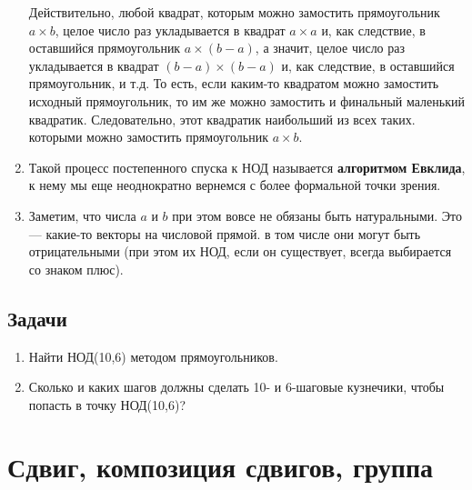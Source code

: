 \begin{enumerate}
Действительно, любой квадрат, которым можно замостить прямоугольник $a\times b$, целое число раз укладывается в квадрат $a\times a$ и, как следствие, в оставшийся прямоугольник $a\times(b-a)$, а значит, целое число раз укладывается в квадрат $(b-a)\times (b-a)$ и, как следствие, в оставшийся прямоугольник, и т.д. То есть, если каким-то квадратом можно замостить исходный прямоугольник, то им же можно замостить и финальный маленький квадратик. Следовательно, этот квадратик наибольший из всех таких. которыми можно замостить прямоугольник $a\times b$.
\item Такой процесс постепенного спуска к НОД называется \textbf{алгоритмом Евклида}, к нему мы еще неоднократно вернемся с более формальной точки зрения.
\item Заметим, что числа $a$ и $b$ при этом вовсе не обязаны быть натуральными. Это --- какие-то векторы на числовой прямой. в том числе они могут быть отрицательными (при этом их НОД, если он существует, всегда выбирается со знаком плюс).
\end{enumerate}
\subsection*{Задачи}
\begin{enumerate}
\item Найти НОД(10,6) методом прямоугольников.
\item Сколько и каких шагов должны сделать 10- и 6-шаговые кузнечики, чтобы попасть в точку НОД(10,6)?
\end{enumerate}





\section{Сдвиг, композиция сдвигов, группа}




